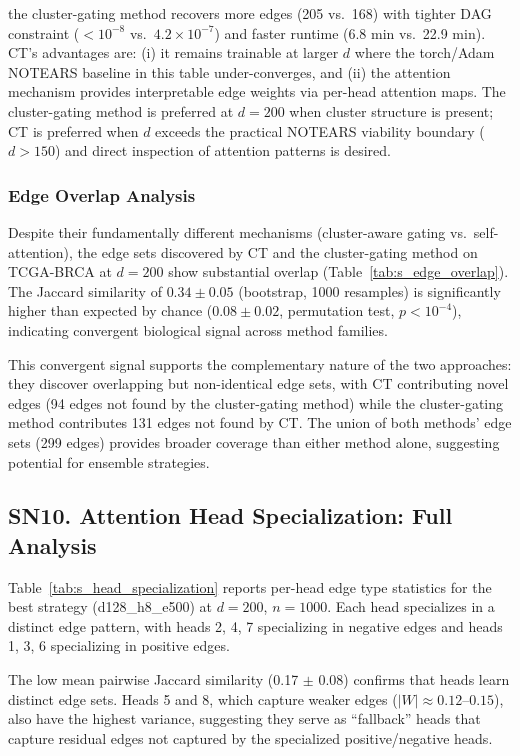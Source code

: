\documentclass[12pt,a4paper]{article}
\begin{document}
the cluster-gating method recovers more edges (205 vs.\ 168) with tighter DAG constraint ($<10^{-8}$ vs.\ $4.2 \times 10^{-7}$) and faster runtime (6.8 min vs.\ 22.9 min). CT's advantages are: (i) it remains trainable at larger $d$ where the torch/Adam NOTEARS baseline in this table under-converges, and (ii) the attention mechanism provides interpretable edge weights via per-head attention maps. The cluster-gating method is preferred at $d=200$ when cluster structure is present; CT is preferred when $d$ exceeds the practical NOTEARS viability boundary ($d > 150$) and direct inspection of attention patterns is desired.

\subsubsection*{Edge Overlap Analysis}

Despite their fundamentally different mechanisms (cluster-aware gating vs.\ self-attention), the edge sets discovered by CT and the cluster-gating method on TCGA-BRCA at $d=200$ show substantial overlap (Table~\ref{tab:s_edge_overlap}). The Jaccard similarity of $0.34 \pm 0.05$ (bootstrap, 1000 resamples) is significantly higher than expected by chance ($0.08 \pm 0.02$, permutation test, $p < 10^{-4}$), indicating convergent biological signal across method families.

This convergent signal supports the complementary nature of the two approaches: they discover overlapping but non-identical edge sets, with CT contributing novel edges (94 edges not found by the cluster-gating method) while the cluster-gating method contributes 131 edges not found by CT. The union of both methods' edge sets (299 edges) provides broader coverage than either method alone, suggesting potential for ensemble strategies.

\subsection*{SN10. Attention Head Specialization: Full Analysis}

Table~\ref{tab:s_head_specialization} reports per-head edge type statistics for the best strategy (d128\_h8\_e500) at $d=200$, $n=1000$. Each head specializes in a distinct edge pattern, with heads 2, 4, 7 specializing in negative edges and heads 1, 3, 6 specializing in positive edges.

The low mean pairwise Jaccard similarity (0.17 $\pm$ 0.08) confirms that heads learn distinct edge sets. Heads 5 and 8, which capture weaker edges ($|W| \approx 0.12$--$0.15$), also have the highest variance, suggesting they serve as ``fallback'' heads that capture residual edges not captured by the specialized positive/negative heads.
\end{document}
